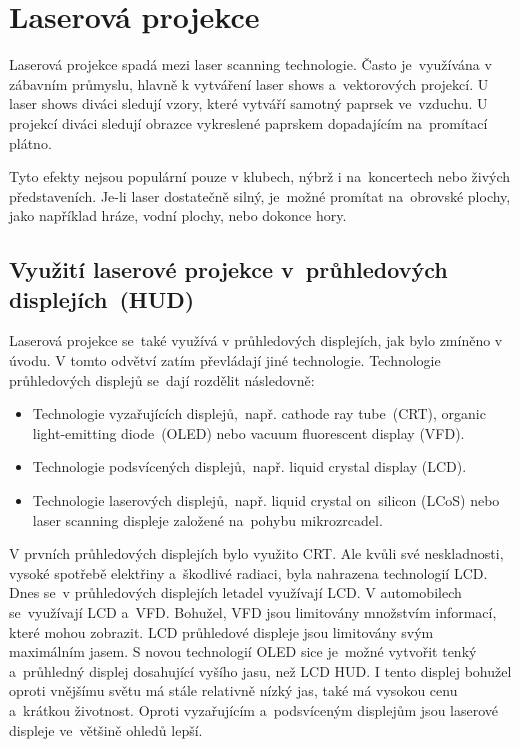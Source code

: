 \chapter{Laserová projekce~\cite{laser-projection}}
Laserová projekce spadá mezi laser scanning technologie. Často je~využívána v zábavním průmyslu, hlavně k vytváření laser shows a~vektorových projekcí. U laser shows diváci sledují vzory, které vytváří samotný paprsek ve~vzduchu. U projekcí diváci sledují obrazce vykreslené paprskem dopadajícím na~promítací plátno.

Tyto efekty nejsou populární pouze v klubech, nýbrž i na~koncertech nebo živých představeních. Je-li laser dostatečně silný, je~možné promítat na~obrovské plochy, jako například hráze, vodní plochy, nebo dokonce hory. 

\section{Využití laserové projekce v~průhledových displejích~(HUD)~\cite{laser-huds}\cite{dev-of-laser-huds-in-driving}}
Laserová projekce se~také využívá v průhledových displejích, jak bylo zmíněno v úvodu. V tomto odvětví zatím převládají jiné technologie. Technologie průhledových displejů se~dají rozdělit následovně:

\begin{itemize}
  \item Technologie vyzařujících displejů,~např. cathode ray tube~(CRT), organic light-emitting diode~(OLED) nebo vacuum fluorescent display (VFD).
  \item Technologie podsvícených displejů,~např. liquid crystal display (LCD).
  \item Technologie laserových displejů,~např. liquid crystal on~silicon (LCoS) nebo laser scanning displeje založené na~pohybu mikrozrcadel.
\end{itemize}

V prvních průhledových displejích bylo využito CRT. Ale kvůli své neskladnosti, vysoké spotřebě elektřiny a~škodlivé radiaci, byla nahrazena technologií LCD. Dnes se~v průhledových displejích letadel využívají LCD. V automobilech se~využívají LCD a~VFD.
Bohužel, VFD jsou limitovány množstvím informací, které mohou zobrazit. LCD průhledové displeje jsou limitovány svým maximálním jasem.
S novou technologií OLED sice je~možné vytvořit tenký a~průhledný displej dosahující vyšího jasu, než LCD HUD.
I tento displej bohužel oproti vnějšímu světu má stále relativně nízký jas, také má vysokou cenu a~krátkou životnost.
Oproti vyzařujícím a~podsvíceným displejům jsou laserové displeje ve~většině ohledů lepší. 

